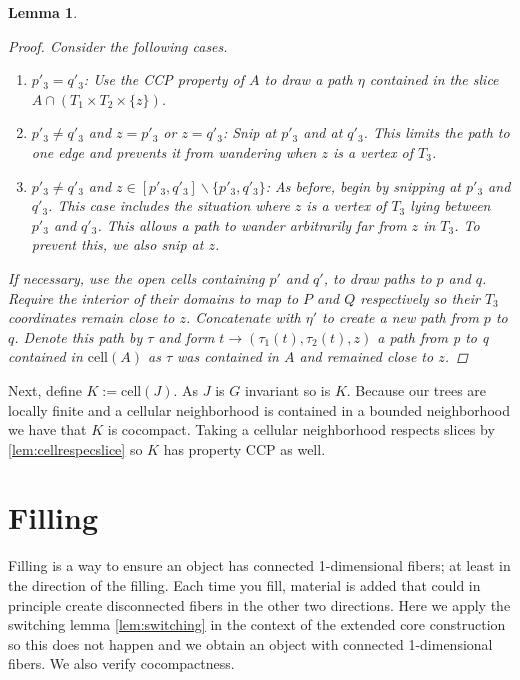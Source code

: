 \documentclass[12pt,parskip=full]{report}
\theoremstyle{plain}
\newtheorem{lem}[thm]{Lemma}
\theoremstyle{definition}
\begin{document}
\begin{lem}
\begin{proof}
        Consider the following cases.
        \begin{enumerate}
            \item \(p'_3=q'_3\): Use the CCP property of \(A\) to draw a path \(\eta\) contained in the slice \(A\cap (T_1\times T_2\times \{z\})\).
            \item \(p'_3\neq q'_3\) and \(z=p'_3\) or \(z=q'_3\): Snip at \(p'_3\) and at \(q'_3\). This limits the path to one edge and prevents it from wandering when \(z\) is a vertex of \(T_3\).
            \item \(p'_3\neq q'_3\) and \(z\in [p'_3,q'_3]\smallsetminus\{p'_3,q'_3\}\): As before, begin by snipping at \(p'_3\) and \(q'_3\). This case includes the situation where \(z\) is a vertex of \(T_3\) lying between \(p'_3\) and \(q'_3\). This allows a path to wander arbitrarily far from \(z\) in \(T_3\). To prevent this, we also snip at \(z\).
        \end{enumerate}

If necessary, use the open cells containing \(p'\) and \(q'\), to draw paths  to \(p\) and \(q\). Require the interior of their domains to map to \(P\) and \(Q\) respectively so their \(T_3\) coordinates remain close to \(z\). Concatenate with \(\eta'\) to create a new path from \(p\) to \(q\). Denote this path by \(\tau\) and form \(t\to (\tau_1(t), \tau_2(t), z)\) a path from p to q contained in \(\text{cell}(A)\) as \(\tau\) was contained in \(A\) and remained close to \(z\).
    
    \end{proof}
    
    
\end{lem}

        
        
        Next, define \(K := \text{cell}(J)\). As \(J\) is \(G\) invariant so is \(K\).  Because our trees are locally finite and a cellular neighborhood is contained in a bounded neighborhood we have that \(K\) is cocompact. Taking a cellular neighborhood respects slices by \ref{lem:cellrespecslice}  so \(K\) has property CCP as well.

\section{Filling}

Filling is a way to ensure an object has connected 1-dimensional fibers; at least in the direction of the filling. Each time you fill, material is added that could in principle create disconnected fibers in the other two  directions. Here we apply the switching lemma \ref{lem:switching} in the context of the extended core construction so this does not happen and we obtain an object with connected 1-dimensional fibers. We also verify cocompactness.
\end{document}
